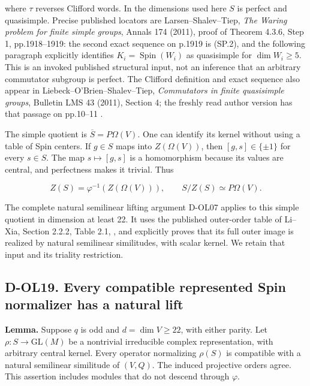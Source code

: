 where \(\tau\) reverses Clifford words. In the dimensions used here \(S\) is perfect and quasisimple. Precise published locators are Larsen--Shalev--Tiep, \emph{The Waring problem for finite simple groups}, Annals 174 (2011), proof of Theorem 4.3.6, Step 1, pp.1918--1919: the second exact sequence on p.1919 is (SP.2), and the following paragraph explicitly identifies \(K_i=\operatorname{Spin}(W_i)\) as quasisimple for \(\dim W_i\ge5\). \cite[proof of Theorem~4.3.6, Step~1, pp.~1918--1919]{HOS:LST2011} This is an invoked published structural input, not an inference that an arbitrary commutator subgroup is perfect. The Clifford definition and exact sequence also appear in Liebeck--O'Brien--Shalev--Tiep, \emph{Commutators in finite quasisimple groups}, Bulletin LMS 43 (2011), Section 4; the freshly read author version has that passage on pp.10--11 \cite[Section~4, author pp.~10--11]{SF:LOST2011}.

The simple quotient is \(\overline S=P\Omega(V)\). One can identify its kernel without using a table of Spin centers. If \(g\in S\) maps into \(Z(\Omega(V))\), then \([g,s]\in\{\pm1\}\) for every \(s\in S\). The map \(s\mapsto[g,s]\) is a homomorphism because its values are central, and perfectness makes it trivial. Thus

\[
 Z(S)=\varphi^{-1}(Z(\Omega(V))),\qquad
 S/Z(S)\simeq P\Omega(V).
 \tag{SP.3}
\]

The complete natural semilinear lifting argument D-OL07 applies to this simple quotient in dimension at least 22. It uses the published outer-order table of Li--Xia, Section 2.2.2, Table 2.1, \cite[Section~2.2.2, Table~2.1]{HES:LiXia2022}, and explicitly proves that its full outer image is realized by natural semilinear similitudes, with scalar kernel. We retain that input and its triality restriction.

\subsection{D-OL19. Every compatible represented Spin normalizer has a natural lift}\label{d-ol19.-every-compatible-represented-spin-normalizer-has-a-natural-lift}

\textbf{Lemma.} Suppose \(q\) is odd and \(d=\dim V\ge22\), with either parity. Let \(\rho:S\to\mathrm{GL}(M)\) be a nontrivial irreducible complex representation, with arbitrary central kernel. Every operator normalizing \(\rho(S)\) is compatible with a natural semilinear similitude of \((V,Q)\). The induced projective orders agree. This assertion includes modules that do not descend through \(\varphi\).

